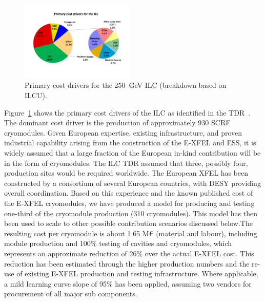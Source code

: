 \documentclass[%
 reprint,
 floatfix,
 amsmath,amssymb,
 aps,
]{revtex4-1}
\begin{document}
\begin{figure}[htbp]
\begin{center}
\includegraphics[width=0.48\textwidth]{figures/eap-chp3-ilccostdrivers.pdf}
 \caption{\label{fig:constructionmodel:ILCPrimaryCostDrivers} Primary cost drivers for the 250~GeV ILC (breakdown based on ILCU).}
\end{center}
\end{figure}

Figure~\ref{fig:constructionmodel:ILCPrimaryCostDrivers} shows the primary cost drivers of the ILC as identified in the
TDR~\cite{Adolphsen:2013kya}. The dominant cost driver is the production of approximately 930 SCRF cryomodules. Given European expertise, 
existing infrastructure, and proven industrial capability arising from the construction 
of the E-XFEL and ESS, it is widely assumed that a large fraction of the European in-kind contribution 
will be in the form of cryomodules. The ILC TDR assumed that three, possibly four, production sites 
would be required worldwide. 
The European XFEL has been constructed by a consortium of several European 
countries, with DESY providing overall coordination. Based on this experience 
and the known published cost of the E-XFEL cryomodules, we have produced a model 
for producing and testing one-third of the cryomodule production (310 
cryomodules). This model has then been used to scale to other possible 
contribution scenarios discussed below.The resulting cost per cryomodule is 
about 1.65 M\euro{} (material and labour), including module production and 100\% 
testing of cavities and cryomodules, which represents an approximate reduction 
of 26\% over the actual E-XFEL cost. This reduction has been estimated through 
the higher production numbers and the re-use of existing E-XFEL production and 
testing infrastructure.  Where applicable, a mild learning curve slope of 95\% 
has been applied, assuming two vendors for procurement of all major sub 
components.
\end{document}
